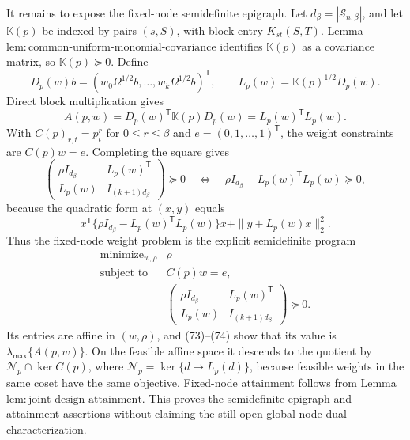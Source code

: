 It remains to expose the fixed-node semidefinite epigraph.  Let \(d_\beta=|\mathcal S_{n,\beta}|\), and let \(\mathbb K(p)\) be indexed by pairs \((s,S)\), with block entry \(K_{st}(S,T)\).  Lemma~\(\mathrm{lem{:}common\text{-}uniform\text{-}monomial\text{-}covariance}\) identifies \(\mathbb K(p)\) as a covariance matrix, so \(\mathbb K(p)\succeq0\).  Define
\[
D_p(w)b=(w_0\Omega^{1/2}b,\ldots,w_k\Omega^{1/2}b)^{\mathsf T},
\qquad
L_p(w)=\mathbb K(p)^{1/2}D_p(w).
\]
Direct block multiplication gives
\[
A(p,w)=D_p(w)^{\mathsf T}\mathbb K(p)D_p(w)
=L_p(w)^{\mathsf T}L_p(w).
\tag{73}
\]
With \(C(p)_{r,t}=p_t^r\) for \(0\le r\le\beta\) and \(e=(0,1,\ldots,1)^{\mathsf T}\), the weight constraints are \(C(p)w=e\).  Completing the square gives
\[
\begin{pmatrix}
\rho I_{d_\beta}&L_p(w)^{\mathsf T}\\
L_p(w)&I_{(k+1)d_\beta}
\end{pmatrix}\succeq0
\quad\Longleftrightarrow\quad
\rho I_{d_\beta}-L_p(w)^{\mathsf T}L_p(w)\succeq0,
\tag{74}
\]
because the quadratic form at \((x,y)\) equals
\[
x^{\mathsf T}\{\rho I_{d_\beta}-L_p(w)^{\mathsf T}L_p(w)\}x
+\|y+L_p(w)x\|_2^2.
\]
Thus the fixed-node weight problem is the explicit semidefinite program
\[
\begin{array}{ll}
\text{minimize}_{w,\rho}&\rho\\
\text{subject to}&C(p)w=e,\\
&\begin{pmatrix}
\rho I_{d_\beta}&L_p(w)^{\mathsf T}\\
L_p(w)&I_{(k+1)d_\beta}
\end{pmatrix}\succeq0.
\end{array}
\tag{75}
\]
Its entries are affine in \((w,\rho)\), and (73)--(74) show that its value is \(\lambda_{\max}\{A(p,w)\}\).  On the feasible affine space it descends to the quotient by \(\mathcal N_p\cap\ker C(p)\), where \(\mathcal N_p=\ker\{d\mapsto L_p(d)\}\), because feasible weights in the same coset have the same objective.  Fixed-node attainment follows from Lemma~\(\mathrm{lem{:}joint\text{-}design\text{-}attainment}\).  This proves the semidefinite-epigraph and attainment assertions without claiming the still-open global node dual characterization.